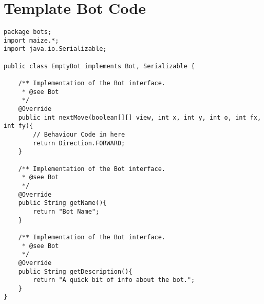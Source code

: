 \documentclass[11pt]{article}
\begin{document}
\pagebreak
\section{Template Bot Code}
\label{section:template}
\begin{lstlisting}
package bots;
import maize.*;
import java.io.Serializable;

public class EmptyBot implements Bot, Serializable {

    /** Implementation of the Bot interface.
     * @see Bot
     */
    @Override
    public int nextMove(boolean[][] view, int x, int y, int o, int fx, int fy){
        // Behaviour Code in here
        return Direction.FORWARD;
    }

    /** Implementation of the Bot interface.
     * @see Bot
     */
    @Override
    public String getName(){
        return "Bot Name";
    }

    /** Implementation of the Bot interface.
     * @see Bot
     */
    @Override
    public String getDescription(){
        return "A quick bit of info about the bot.";
    }
}
\end{lstlisting}
\end{document}
